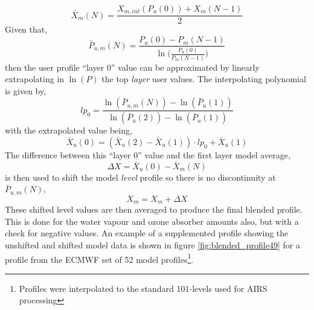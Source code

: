 \begin{equation*}
  \bar{X}_{m}\left(N\right) = \frac{X_{m,int}\left(P_{u}(0)\right) + X_{m}\left(N-1\right)}{2}
\end{equation*}
Given that,
\begin{equation*}
  \bar{P}_{u,m}\left(N\right) = \frac{P_{u}\left(0\right) - P_{m}\left(N-1\right)}{\ln{}\bigg(\frac{\displaystyle P_{u}\left(0\right)}{\displaystyle P_{m}\left(N-1\right)}\bigg)}
\end{equation*}
then the user profile ``layer 0'' value can be approximated by linearly extrapolating in $\ln{(P)}$ the top \emph{layer} user values. The interpolating polynomial is given by,
\begin{equation*}
  lp_{0} = \frac{\ln\left(\bar{P}_{u,m}\left(N\right)\right) - \ln\left(\bar{P}_{u}\left(1\right)\right)}
                {\ln\left(\bar{P}_{u}  \left(2\right)\right) - \ln\left(\bar{P}_{u}\left(1\right)\right)}
\end{equation*}
with the extrapolated value being,
\begin{equation*}
  \bar{X}_{u}(0) = \left(\bar{X}_{u}(2) - \bar{X}_{u}(1)\right)\cdot lp_{0} + \bar{X}_{u}(1)
\end{equation*}
The difference between this ``layer 0'' value and the first layer model average,
\begin{equation*}
  \Delta X = \bar{X}_{u}(0) - \bar{X}_{m}(N)
\end{equation*}
is then used to shift the model \emph{level} profile so there is no discontinuity at $\bar{P}_{u,m}\left(N\right)$,
\begin{equation*}
  X_{m} = X_{m} + \Delta X
\end{equation*}
These shifted level values are then averaged to produce the final blended profile. This is done for the water vapour and ozone absorber amounts also, but with a check for negative values. An example of a supplemented profile showing the unshifted and shifted model data is shown in figure \ref{fig:blended_profile49} for a profile from the ECMWF set of 52 model profiles\cite{ECMWF_profile_set}\footnote{Profiles were interpolated to the standard 101-levels used for AIRS processing}.

